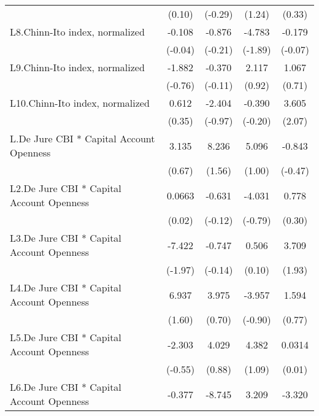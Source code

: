 {\begin{longtable}{l*{4}{c}}
                &   (0.10)         &  (-0.29)         &   (1.24)         &   (0.33)         \\
[1em]
L8.Chinn-Ito index, normalized&   -0.108         &   -0.876         &   -4.783         &   -0.179         \\
                &  (-0.04)         &  (-0.21)         &  (-1.89)         &  (-0.07)         \\
[1em]
L9.Chinn-Ito index, normalized&   -1.882         &   -0.370         &    2.117         &    1.067         \\
                &  (-0.76)         &  (-0.11)         &   (0.92)         &   (0.71)         \\
[1em]
L10.Chinn-Ito index, normalized&    0.612         &   -2.404         &   -0.390         &    3.605\sym{*}  \\
                &   (0.35)         &  (-0.97)         &  (-0.20)         &   (2.07)         \\
[1em]
L.De Jure CBI * Capital Account Openness&    3.135         &    8.236         &    5.096         &   -0.843         \\
                &   (0.67)         &   (1.56)         &   (1.00)         &  (-0.47)         \\
[1em]
L2.De Jure CBI * Capital Account Openness&   0.0663         &   -0.631         &   -4.031         &    0.778         \\
                &   (0.02)         &  (-0.12)         &  (-0.79)         &   (0.30)         \\
[1em]
L3.De Jure CBI * Capital Account Openness&   -7.422\sym{*}  &   -0.747         &    0.506         &    3.709         \\
                &  (-1.97)         &  (-0.14)         &   (0.10)         &   (1.93)         \\
[1em]
L4.De Jure CBI * Capital Account Openness&    6.937         &    3.975         &   -3.957         &    1.594         \\
                &   (1.60)         &   (0.70)         &  (-0.90)         &   (0.77)         \\
[1em]
L5.De Jure CBI * Capital Account Openness&   -2.303         &    4.029         &    4.382         &   0.0314         \\
                &  (-0.55)         &   (0.88)         &   (1.09)         &   (0.01)         \\
[1em]
L6.De Jure CBI * Capital Account Openness&   -0.377         &   -8.745         &    3.209         &   -3.320         \\

\end{longtable}}

